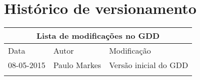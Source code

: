 \documentclass[12pt]{article}
\begin{document}

\onehalfspacing
\tableofcontents
\pagebreak
\section*{Histórico de versionamento}
\begin{longtable}{|l|l|l|}
\hline
\multicolumn{3}{|c|}{Lista de modificações no GDD}
\\
\hline
Data & Autor & Modificação
\\
\hline
08-05-2015 & Paulo Markes & Versão inicial do GDD
\\
\hline
\\
\hline
\end{longtable}

\newpage

\pagebreak

\pagebreak

\pagebreak

\end{document}
